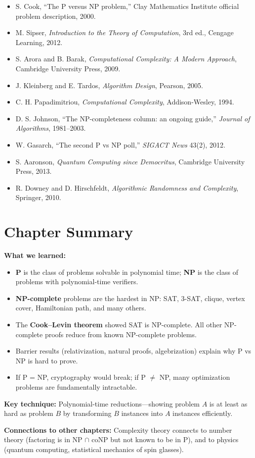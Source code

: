 \begin{itemize}
  \item S. Cook, ``The P versus NP problem,'' Clay Mathematics Institute official problem description, 2000.
  \item M. Sipser, \textit{Introduction to the Theory of Computation}, 3rd ed., Cengage Learning, 2012.
  \item S. Arora and B. Barak, \textit{Computational Complexity: A Modern Approach}, Cambridge University Press, 2009.
  \item J. Kleinberg and E. Tardos, \textit{Algorithm Design}, Pearson, 2005.
  \item C. H. Papadimitriou, \textit{Computational Complexity}, Addison-Wesley, 1994.
  \item D. S. Johnson, ``The NP-completeness column: an ongoing guide,'' \textit{Journal of Algorithms}, 1981--2003.
  \item W. Gasarch, ``The second P vs NP poll,'' \textit{SIGACT News} 43(2), 2012.
  \item S. Aaronson, \textit{Quantum Computing since Democritus}, Cambridge University Press, 2013.
  \item R. Downey and D. Hirschfeldt, \textit{Algorithmic Randomness and Complexity}, Springer, 2010.
\end{itemize}

\section*{Chapter Summary}

\noindent\textbf{What we learned:}
\begin{itemize}
  \item \textbf{P} is the class of problems solvable in polynomial time; \textbf{NP} is the class of problems with polynomial-time verifiers.
  \item \textbf{NP-complete} problems are the hardest in NP: SAT, 3-SAT, clique, vertex cover, Hamiltonian path, and many others.
  \item The \textbf{Cook--Levin theorem} showed SAT is NP-complete. All other NP-complete proofs reduce from known NP-complete problems.
  \item Barrier results (relativization, natural proofs, algebrization) explain why P vs NP is hard to prove.
  \item If P = NP, cryptography would break; if P $\neq$ NP, many optimization problems are fundamentally intractable.
\end{itemize}

\noindent\textbf{Key technique:} Polynomial-time reductions---showing problem $A$ is at least as hard as problem $B$ by transforming $B$ instances into $A$ instances efficiently.

\noindent\textbf{Connections to other chapters:} Complexity theory connects to number theory (factoring is in NP $\cap$ coNP but not known to be in P), and to physics (quantum computing, statistical mechanics of spin glasses).

